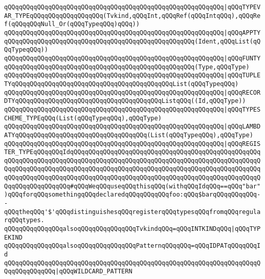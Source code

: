 \verb|qQQqqQQqqQQqqQQqqQQqqQQqqQQqqQQqqQQqqQQqqQQqqQQqqQQqqQQqqQQq|\verb#|qQQqTYPEVAR_TYPEqQQqqQQqqQQqqQQqqQQq(Tvkind,qQQqInt,qQQqRef(qQQqIntqQQq),qQQqRef(qQQqqQQqNull_Or(qQQqTypeqQQq)qQQq))#\newline
\verb|qQQqqQQqqQQqqQQqqQQqqQQqqQQqqQQqqQQqqQQqqQQqqQQqqQQqqQQqqQQq|\verb#|qQQqAPPTYqQQqqQQqqQQqqQQqqQQqqQQqqQQqqQQqqQQqqQQqqQQqqQQqqQQq(Ident,qQQqList(qQQqTypeqQQq))#\newline
\verb|qQQqqQQqqQQqqQQqqQQqqQQqqQQqqQQqqQQqqQQqqQQqqQQqqQQqqQQqqQQq|\verb#|qQQqFUNTYqQQqqQQqqQQqqQQqqQQqqQQqqQQqqQQqqQQqqQQqqQQqqQQqqQQq(Type,qQQqType)#\newline
\verb|qQQqqQQqqQQqqQQqqQQqqQQqqQQqqQQqqQQqqQQqqQQqqQQqqQQqqQQqqQQq|\verb#|qQQqTUPLETYqQQqqQQqqQQqqQQqqQQqqQQqqQQqqQQqqQQqqQQqqQQqList(qQQqTypeqQQq)#\newline
\verb|qQQqqQQqqQQqqQQqqQQqqQQqqQQqqQQqqQQqqQQqqQQqqQQqqQQqqQQqqQQq|\verb#|qQQqRECORDTYqQQqqQQqqQQqqQQqqQQqqQQqqQQqqQQqqQQqqQQqListqQQq((Id,qQQqType))#\newline
\verb|qQQqqQQqqQQqqQQqqQQqqQQqqQQqqQQqqQQqqQQqqQQqqQQqqQQqqQQqqQQq|\verb#|qQQqTYPESCHEME_TYPEqQQq(List(qQQqTypeqQQq),qQQqType)#\newline
\verb|qQQqqQQqqQQqqQQqqQQqqQQqqQQqqQQqqQQqqQQqqQQqqQQqqQQqqQQqqQQq|\verb#|qQQqLAMBDATYqQQqqQQqqQQqqQQqqQQqqQQqqQQqqQQqqQQq(List(qQQqTypeqQQq),qQQqType)#\newline
\verb|qQQqqQQqqQQqqQQqqQQqqQQqqQQqqQQqqQQqqQQqqQQqqQQqqQQqqQQqqQQq|\verb#|qQQqREGISTER_TYPEqQQqqQQqIdqQQqqQQqqQQqqQQqqQQqqQQqqQQqqQQqqQQqqQQqqQQqqQQqqQQqqQQqqQQqqQQqqQQqqQQqqQQqqQQqqQQqqQQqqQQqqQQqqQQqqQQqqQQqqQQqqQQqqQQqqQQqqQQqqQQqqQQqqQQqqQQqqQQqqQQqqQQqqQQqqQQqqQQqqQQqqQQqqQQqqQQqqQQqqQQqqQQqqQQqqQQqqQQqqQQqqQQqqQQqqQQqqQQqqQQqqQQqqQQqqQQqqQQqqQQqqQQqqQQqqQQqqQQqqQQqqQQqqQQq#\verb|#qQQqWeqQQquseqQQqthisqQQq(withqQQqIdqQQq==qQQq"bar")qQQqforqQQqsomethingqQQqdeclaredqQQqqQQqqQQqfoo:qQQq$barqQQqqQQqqQQq--qQQqtheqQQq'$'qQQqdistinguishesqQQqregisterqQQqtypesqQQqfromqQQqregularqQQqtypes.|\newline
\newline
\verb|qQQqqQQqqQQqqQQqalsoqQQqqQQqqQQqqQQqTvkindqQQq=qQQqINTKINDqQQq|\verb#|qQQqTYPEKIND#\newline
\newline
\verb|qQQqqQQqqQQqqQQqalsoqQQqqQQqqQQqqQQqPatternqQQqqQQq=qQQqIDPATqQQqqQQqId|\newline
\verb|qQQqqQQqqQQqqQQqqQQqqQQqqQQqqQQqqQQqqQQqqQQqqQQqqQQqqQQqqQQqqQQqqQQqqQQqqQQqqQQqqQQq|\verb#|qQQqWILDCARD_PATTERN#\newline
